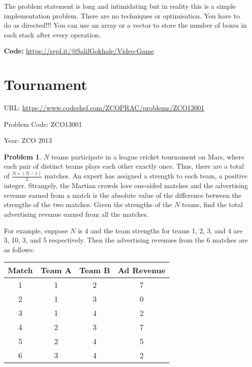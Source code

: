 \documentclass[twoside,12pt,a4paper,english]{book}
\theoremstyle{definition}
\theoremstyle{problemstyle}
\newtheorem*{problem}{Problem} %
\theoremstyle{problemstyle}
\theoremstyle{problemstyle}
\begin{document}
\begin{tcolorbox}[title=Solution]

The problem statement is long and intimidating but in reality this is a simple implementation problem. There are no techniques or optimisation. You have to do as directed!!! You can use an array or a vector to store the number of boxes in each stack after every operation.

\textbf{Code:} \url{https://repl.it/@SalilGokhale/Video-Game}
\end{tcolorbox}
\newpage

\section{Tournament}

URL: \url{https://www.codechef.com/ZCOPRAC/problems/ZCO13001}

Problem Code: ZCO13001

Year: ZCO 2013

\begin{problem}

$N$ teams participate in a league cricket tournament on Mars, where each pair of distinct teams plays each other exactly once. Thus, there are a total of $\frac{N\times (N-1)}{2}$ matches. An expert has assigned a strength to each team, a positive integer. Strangely, the Martian crowds love one-sided matches and the advertising revenue earned from a match is the absolute value of the difference between the strengths of the two matches. Given the strengths of the $N$ teams, find the total advertising revenue earned from all the matches.


For example, suppose $N$ is $4$ and the team strengths for teams 1, 2, 3, and 4 are 3, 10, 3, and 5 respectively. Then the advertising revenues from the 6 matches are as follows:

\begin{table}[!ht]
\begin{tabular}{|c|c|c|c|}
\hline
\textbf{Match} & \textbf{Team A} & \textbf{Team B} & \textbf{Ad Revenue} \\ \hline
1              & 1               & 2               & 7                   \\ \hline
2              & 1               & 3               & 0                   \\ \hline
3              & 1               & 4               & 2                   \\ \hline
4              & 2               & 3               & 7                   \\ \hline
5              & 2               & 4               & 5                   \\ \hline
6              & 3               & 4               & 2                   \\ \hline
\end{tabular}
\end{table}

\end{problem}
\end{document}
